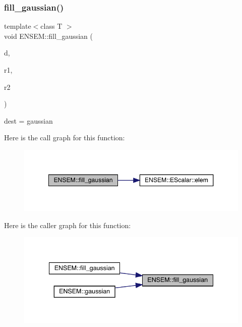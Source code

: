 \subsubsection{\texorpdfstring{fill\_gaussian()}{fill\_gaussian()}}
{\footnotesize\ttfamily template$<$class T $>$ \\
void E\+N\+S\+E\+M\+::fill\+\_\+gaussian (\begin{DoxyParamCaption}\item[{\mbox{\hyperlink{classENSEM_1_1EScalar}{E\+Scalar}}$<$ T $>$ \&}]{d,  }\item[{\mbox{\hyperlink{classENSEM_1_1EScalar}{E\+Scalar}}$<$ T $>$ \&}]{r1,  }\item[{\mbox{\hyperlink{classENSEM_1_1EScalar}{E\+Scalar}}$<$ T $>$ \&}]{r2 }\end{DoxyParamCaption})\hspace{0.3cm}{\ttfamily [inline]}}



dest = gaussian 

Here is the call graph for this function\+:
\nopagebreak
\begin{figure}[H]
\begin{center}
\leavevmode
\includegraphics[width=348pt]{d4/dca/group__escalar_ga3598759ad3e33b4008dd80a044cc75a8_cgraph}
\end{center}
\end{figure}
Here is the caller graph for this function\+:
\nopagebreak
\begin{figure}[H]
\begin{center}
\leavevmode
\includegraphics[width=340pt]{d4/dca/group__escalar_ga3598759ad3e33b4008dd80a044cc75a8_icgraph}
\end{center}
\end{figure}
\mbox{\label{group__escalar_gab876765eed1c2ac8b1d1adcf0b0ba123}} 
